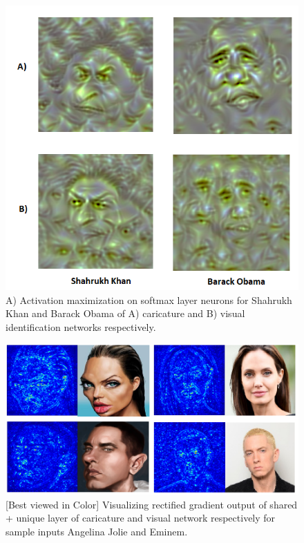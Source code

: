 \begin{figure}[h]
\centering
\includegraphics[scale=0.35]{images/actmax.png}
\caption{A) Activation maximization on softmax layer neurons for Shahrukh Khan and Barack Obama of A) caricature and B) visual identification networks respectively.}
\label{fig:Activation maximization}
\end{figure}

\begin{figure}[h]
\centering
\includegraphics[scale=0.3]{images/saliency2.png}
\caption{[Best viewed in Color] Visualizing rectified gradient output of shared + unique layer of caricature and visual network respectively for sample inputs Angelina Jolie and Eminem.}
\label{fig:Saliency map}
\end{figure}



